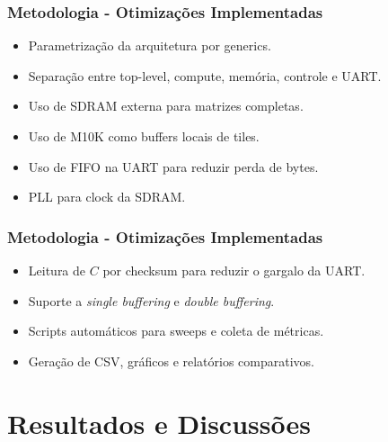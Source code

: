 \documentclass{beamer}
\begin{document}
\begin{frame}
\frametitle{Metodologia - Otimizações Implementadas}

\begin{itemize}
    \item Parametrização da arquitetura por generics.
    \item Separação entre top-level, compute, memória, controle e UART.
    \item Uso de SDRAM externa para matrizes completas.
    \item Uso de M10K como buffers locais de tiles.
    \item Uso de FIFO na UART para reduzir perda de bytes.
    \item PLL para clock da SDRAM.
\end{itemize}

\end{frame}

\begin{frame}
\frametitle{Metodologia - Otimizações Implementadas}

\begin{itemize}
    \item Leitura de \(C\) por checksum para reduzir o gargalo da UART.
    \item Suporte a \textit{single buffering} e \textit{double buffering}.
    \item Scripts automáticos para sweeps e coleta de métricas.
    \item Geração de CSV, gráficos e relatórios comparativos.
\end{itemize}

\end{frame}

\section{Resultados e Discussões}
\end{document}
